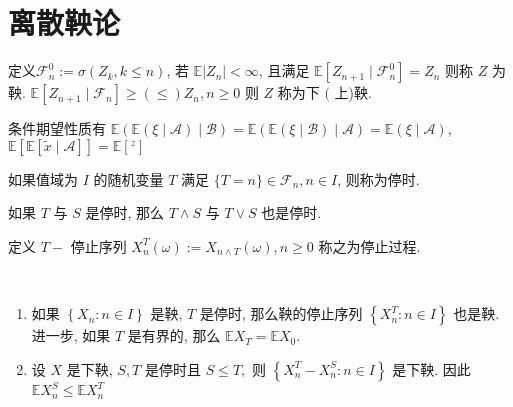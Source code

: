 \documentclass[10pt]{yerbaformat}
\begin{document}
\section{离散鞅论}

\begin{definition}
    定义$\mathcal{F}_{n}^{0}:=\sigma\left(Z_{k}, k \leq n\right)$, 若 $\mathbb{E}\left|Z_{n}\right|<\infty$, 且满足 $\mathbb{E}\left[Z_{n+1} \mid \mathcal{F}_{n}^{0}\right]=Z_{n}$ 则称 $Z$ 为鞅. $\mathbb{E}\left[Z_{n+1} \mid \mathcal{F}_{n}\right] \geq(\leq) Z_{n}, n \geq 0$ 则 $Z$ 称为下 $($ 上)鞅.
\end{definition}

\par 条件期望性质有 $\mathbb{E}(\mathbb{E}(\xi \mid \mathcal{A}) \mid \mathcal{B})=\mathbb{E}(\mathbb{E}(\xi \mid \mathcal{B}) \mid \mathcal{A})=\mathbb{E}(\xi \mid \mathcal{A})$, $\mathbb{E}[\mathbb{E}[\tilde{x} \mid \mathcal{A}]]=\mathbb{E}\left[{ }^{z}\right]$



\begin{definition}
    如果值域为 $I$ 的随机变量 $T$ 满足 $\{T=n\} \in \mathcal{F}_{n}, n \in I$, 则称为停时.
\end{definition}

\begin{lemma}
    如果 $T$ 与 $S$ 是停时, 那么 $T \wedge S$ 与 $T \vee S$ 也是停时.
\end{lemma}

\begin{definition}[停止过程]
    定义 $T-$ 停止序列 $X_{n}^{T}(\omega):=X_{n \wedge T}(\omega), n \geq 0$ 称之为停止过程.
\end{definition}

\begin{theorem}[有界停止定理]
    \
    \begin{enumerate}
        \item 如果 $\left\{X_{n}: n \in I\right\}$ 是鞅, $T$ 是停时, 那么鞅的停止序列 $\left\{X_{n}^{T}: n \in I\right\}$ 也是鞅. 进一步, 如果 $T$ 是有界的, 那么 $\mathbb{E} X_{T}=\mathbb{E} X_{0}$.
        \item 设 $X$ 是下鞅, $S, T$ 是停时且 $S \leq T,$ 则 $\left\{X_{n}^{T}-X_{n}^{S}: n \in I\right\}$ 是下鞅. 因此 $\mathbb{E} X_{n}^{S} \leq \mathbb{E} X_{n}^{T}$
    \end{enumerate}
\end{theorem}
\end{document}
